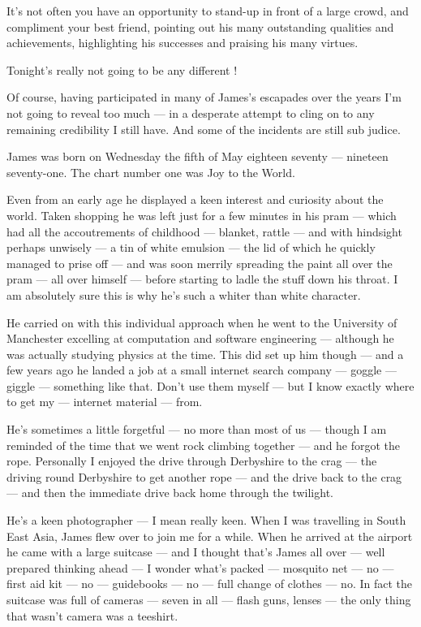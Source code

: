 \bigskip{}

It's not often you have an opportunity to stand-up in front of a large
crowd, and compliment your best friend, pointing out his many
outstanding qualities and achievements, highlighting his successes and
praising his many virtues.

Tonight's really not going to be any different !

Of course, having participated in many of James's escapades over the
years I'm not going to reveal too much --- in a desperate attempt to
cling on to any remaining credibility I still have. And some of the
incidents are still sub judice.

James was born on Wednesday the fifth of May eighteen seventy ---
nineteen seventy-one. The chart number one was Joy to the World.

Even from an early age he displayed a keen interest and curiosity
about the world. Taken shopping he was left just for a few minutes in
his pram --- which had all the accoutrements of childhood --- blanket,
rattle --- and with hindsight perhaps unwisely --- a tin of white
emulsion --- the lid of which he quickly managed to prise off --- and
was soon merrily spreading the paint all over the pram --- all over
himself --- before starting to ladle the stuff down his throat. I am
absolutely sure this is why he's such a whiter than white character.

He carried on with this individual approach when he went to the
University of Manchester excelling at computation and software
engineering --- although he was actually studying physics at the
time. This did set up him though --- and a few years ago he landed a
job at a small internet search company --- goggle --- giggle ---
something like that. Don't use them myself --- but I know exactly
where to get my --- internet material --- from.

He's sometimes a little forgetful --- no more than most of us ---
though I am reminded of the time that we went rock climbing together
--- and he forgot the rope. Personally I enjoyed the drive through
Derbyshire to the crag --- the driving round Derbyshire to get another
rope --- and the drive back to the crag --- and then the immediate
drive back home through the twilight.

He's a keen photographer --- I mean really keen. When I was travelling
in South East Asia, James flew over to join me for a while. When he
arrived at the airport he came with a large suitcase --- and I thought
that's James all over --- well prepared thinking ahead --- I wonder
what's packed --- mosquito net --- no --- first aid kit --- no ---
guidebooks --- no --- full change of clothes --- no. In fact the
suitcase was full of cameras --- seven in all --- flash guns, lenses
--- the only thing that wasn't camera was a teeshirt.


